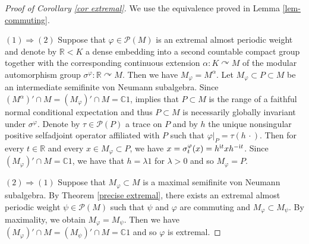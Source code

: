 \documentclass[a4paper,11pt]{amsart}
\numberwithin{equation}{section}
\theoremstyle{definition}
\newcommand{\R}{\mathbb{R}}
\newcommand{\C}{\mathbb{C}}
\newcommand{\cP}{\mathcal{P}}
\newcommand{\ri}{\text{\rm i}}
\begin{document}
\begin{proof}[Proof of Corollary \ref{cor extremal}]
We use the equivalence proved in Lemma \ref{lem-commuting}.  

$(1) \Rightarrow (2)$ Suppose that $\varphi \in \mathcal P(M)$ is an extremal almost periodic weight and denote by $\R < K$ a dense embedding into a second countable compact group together with the corresponding continuous extension $\alpha : K \curvearrowright M$ of the modular automorphism group $\sigma^\varphi : \R \curvearrowright M$. Then we have $M_\varphi = M^\alpha$. Let $M_\varphi \subset P \subset M$ be an intermediate semifinite von Neumann subalgebra. Since $(M^\alpha)' \cap M = (M_\varphi)' \cap M = \C 1$, \cite[Theorem 3.15]{ILP96} implies that $P \subset M$ is the range of a faithful normal conditional expectation and thus $P \subset M$ is necessarily globally invariant under $\sigma^\varphi$. Denote by $\tau \in \mathcal P(P)$ a trace on $P$ and by $h$ the unique nonsingular positive selfadjoint operator affiliated with $P$ such that $\varphi|_P = \tau(h \, \cdot)$. Then for every $t \in \R$ and every $x \in M_\varphi \subset P$, we have $x = \sigma_t^\varphi(x) = h^{\ri t} x h^{- \ri t}$. Since $(M_\varphi)' \cap M = \C 1$, we have that $h = \lambda 1$ for $\lambda > 0$ and so $M_\varphi = P$.

$(2) \Rightarrow (1)$ Suppose that $M_\varphi \subset M$ is a maximal semifinite von Neumann subalgebra. By Theorem \ref{precise extremal}, there exists an extremal almost periodic weight $\psi \in \cP(M)$ such that $\psi$ and $\varphi$ are commuting and $M_\varphi \subset M_\psi$. By maximality, we obtain $M_\varphi = M_\psi$. Then we have $(M_\varphi)' \cap M = (M_\psi)' \cap M = \C 1$ and so $\varphi$ is extremal. 
\end{proof}
\end{document}

